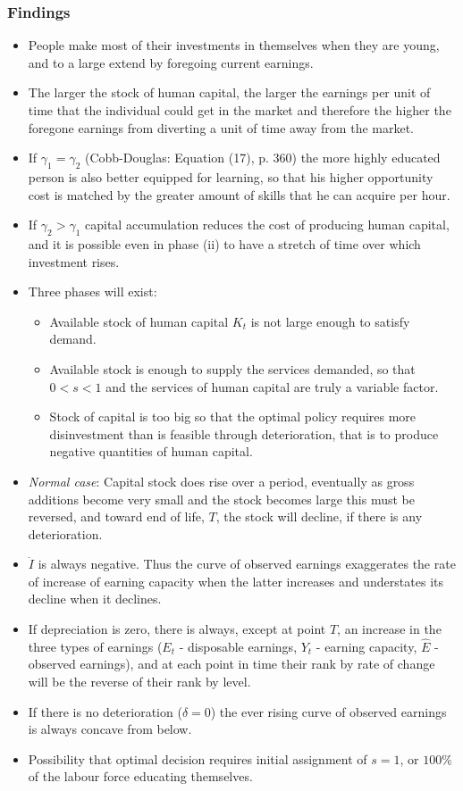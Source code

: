 \documentclass[12pt,a4paper]{article}
\begin{document}
  \subsubsection{Findings}
  \begin{itemize}
    \item People make most of their investments in themselves when they are young, and to a large extend by foregoing current earnings.
    \item The larger the stock of human capital, the larger the earnings per unit of time that the individual could get in the market and therefore the higher the foregone earnings from diverting a unit of time away from the market.
    \item If $\gamma _{1} = \gamma _{2}$ (Cobb-Douglas: Equation (17), p. 360) the more highly educated person is also better equipped for learning, so that his higher opportunity cost is matched by the greater amount of skills that he can acquire per hour.
    \item If $\gamma _{2} > \gamma _{1}$ capital accumulation reduces the cost of producing human capital, and it is possible even in phase (ii) to have a stretch of time over which investment rises.
    \item Three phases will exist:
      \begin{itemize}
        \item Available stock of human capital $K_t$ is not large enough to satisfy demand.
        \item Available stock is enough to supply the services demanded, so that $0<s<1$ and the services of human capital are truly a variable factor.
        \item Stock of capital is too big so that the optimal policy requires more disinvestment than is feasible through deterioration, that is to produce negative quantities of human capital.
      \end{itemize}
    \item \emph{Normal case}: Capital stock does rise over a period, eventually as gross additions become very small and the stock becomes large this must be reversed, and toward end of life, $T$, the stock will decline, if there is any deterioration.
    \item $\dot{I}$ is always negative. Thus the curve of observed earnings exaggerates the rate of increase of earning capacity when the latter increases and understates its decline when it declines.
    \item If depreciation is zero, there is always, except at point $T$, an increase in the three types of earnings ($E_t$ - disposable earnings, $Y_t$ - earning capacity, $\hat{E}$ - observed earnings), and at each point in time their rank by rate of change will be the reverse of their rank by level.
    \item If there is no deterioration ($\delta = 0$) the ever rising curve of observed earnings is always concave from below.
    \item Possibility that optimal decision requires initial assignment of $s=1$, or $100\%$ of the labour force educating themselves.
  \end{itemize}
\end{document}
